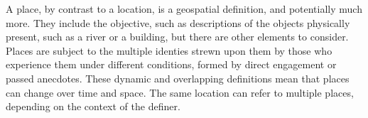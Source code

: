 
A place, by contrast to a location, is a geospatial definition, and potentially much more. They include the objective, such as descriptions of the objects physically present, such as a river or a building, but there are other elements to consider. Places are subject to the multiple identies strewn upon them by those who experience them under different conditions, formed by direct engagement or passed anecdotes\cite{MasseyD1991}. %
These dynamic and overlapping definitions mean that places can change over time and space. The same location can refer to multiple places, depending on the context of the definer. %
